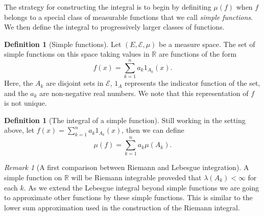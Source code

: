 \documentclass[11pt]{article}
\theoremstyle{definition}
\newtheorem{dfn}[thm]{Definition}
\theoremstyle{remark}
\newtheorem{remark}[thm]{Remark}
\begin{document}
The strategy for constructing the integral is to begin by definiting $\mu(f)$ when $f$ belongs to a special class of measurable functions that we call \emph{simple functions}. We then define the integral to progressively larger classes of functions. 

\begin{dfn}[Simple functions]
Let $(E, \mathcal{E}, \mu)$ be a measure space. The set of simple functions on this space taking values in $\mathbb{R}$ are functions of the form
\[ f(x) = \sum_{k=1}^n a_k 1_{A_k}(x). \] Here, the $A_k$ are disjoint sets in $\mathcal{E}$, $1_{A}$ represents the indicator function of the set, and the $a_k$ are non-negative real numbers. We note that this representation of $f$ is not unique.
\end{dfn}

\begin{dfn}[The integral of a simple function]
Still working in the setting above, let $f(x) = \sum_{k=1}^n a_k 1_{A_k}(x)$, then we can define
\[ \mu(f) = \sum_{k=1}^n a_k \mu(A_k). \]
\end{dfn}
\begin{remark}[A first comparison between Riemann and Lebesgue integration]
A simple function on $\mathbb{R}$ will be Riemann integrable proveded that $\lambda(A_k)< \infty$ for each $k$. As we extend the Lebesgue integral beyond simple functions we are going to approximate other functions by these simple functions. This is similar to the lower sum approximation used in the construction of the Riemann integral.
\end{remark}
\end{document}

